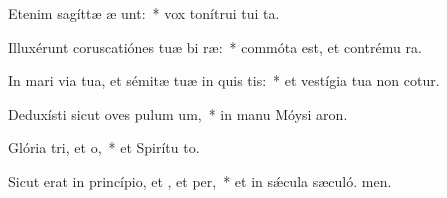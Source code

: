 \item Etenim sagíttæ æ unt:~* vox tonítrui tui  ta.
\item Illuxérunt coruscatiónes tuæ bi ræ:~* commóta est, et contrému ra.
\item In mari via tua, et sémitæ tuæ in quis tis:~* et vestígia tua non cotur.
\item Deduxísti sicut oves pulum um,~* in manu Móysi  aron.
\item Glória tri, et o,~* et Spirítu to.
\item Sicut erat in princípio, et , et per,~* et in sǽcula sæculó. men.
